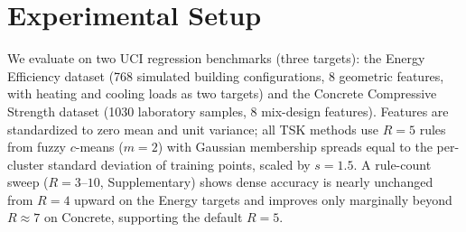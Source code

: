 \documentclass[review,1p,times]{elsarticle}
\begin{document}
\section{Experimental Setup}
\label{sec:setup}

We evaluate on two UCI regression benchmarks (three targets): the Energy Efficiency dataset \cite{tsanas2012accurate} (768 simulated building configurations, 8 geometric features, with heating and cooling loads as two targets) and the Concrete Compressive Strength dataset \cite{yeh1998modeling} (1030 laboratory samples, 8 mix-design features). Features are standardized to zero mean and unit variance; all TSK methods use $R=5$ rules from fuzzy $c$-means ($m=2$) with Gaussian membership spreads equal to the per-cluster standard deviation of training points, scaled by $s=1.5$.
A rule-count sweep ($R=3$--$10$, Supplementary) shows dense accuracy is nearly unchanged from $R=4$ upward on the Energy targets and improves only marginally beyond $R\approx7$ on Concrete, supporting the default $R=5$.
\end{document}
